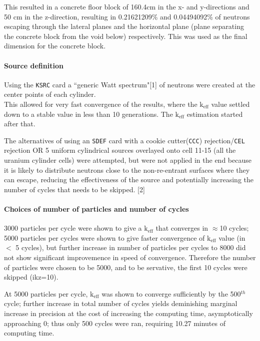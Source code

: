 \documentclass[a4paper, 12pt]{article}
\begin{document}
This resulted in a concrete floor block of 160.4cm in the x- and y-directions and 50 cm in the z-direction, resulting in 0.21621209\%  and 0.04494092\% of neutrons escaping through the lateral planes and the horizontal plane (plane separating the concrete block from the void below) respectively. This was used as the final dimension for the concrete block.

\paragraph{Source definition\indent}
Using the \texttt{KSRC} card a ``generic Watt spectrum"[1] of neutrons were created at the center points of each cylinder.
\\This allowed for very fast convergence of the results, where the $\text{k}_{\text{eff}}$ value settled down to a stable value in less than 10 generations. The $\text{k}_{\text{eff}}$ estimation started after that.

The alternatives of using an \texttt{SDEF} card with a cookie cutter(\texttt{CCC}) rejection/\texttt{CEL} rejection OR 5 uniform cylindrical sources overlayed onto cell 11-15 (all the uranium cylinder cells) were attempted, but were not applied in the end because it is likely to distribute neutrons close to the non-re-entrant surfaces where they can escape, reducing the effectiveness of the source and potentially increasing the number of cycles that needs to be skipped. [2]

\paragraph{Choices of number of particles and number of cycles\indent}
3000 particles per cycle were shown to give a $\text{k}_{\text{eff}}$ that converges in $\approx$10 cycles; 5000 particles per cycles were shown to give faster convergence of $\text{k}_{\text{eff}}$ value (in $<$ 5 cycles), but further increase in number of particles per cycles to 8000 did not show significant improvemence in speed of convergence. Therefore the number of particles were chosen to be 5000, and to be servative, the first 10 cycles were skipped (ikz=10).

At 5000 particles per cycle, $\text{k}_{\text{eff}}$ was shown to converge sufficiently by the 500${}^{th}$ cycle; further increase in total number of cycles yields deminishing marginal increase in precision at the cost of increasing the computing time, asymptotically approaching 0; thus only 500 cycles were ran, requiring 10.27 minutes of computing time.
\end{document}
